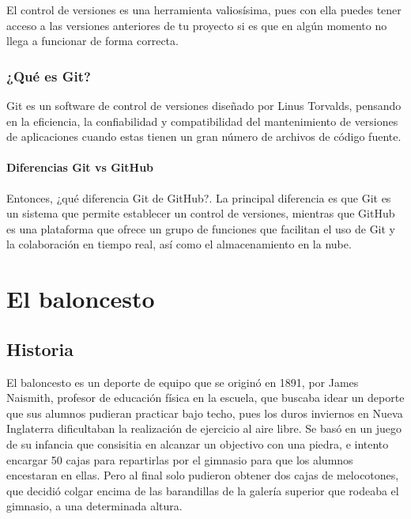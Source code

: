 \documentclass[
]{article}
\begin{document}
El control de versiones es una herramienta valiosísima, pues con ella
puedes tener acceso a las versiones anteriores de tu proyecto si es que
en algún momento no llega a funcionar de forma correcta.

\hypertarget{quuxe9-es-git}{%
\subsubsection{¿Qué es Git?}\label{quuxe9-es-git}}

Git es un software de control de versiones diseñado por Linus Torvalds,
pensando en la eficiencia, la confiabilidad y compatibilidad del
mantenimiento de versiones de aplicaciones cuando estas tienen un gran
número de archivos de código fuente.

\hypertarget{diferencias-git-vs-github}{%
\paragraph{Diferencias Git vs GitHub}\label{diferencias-git-vs-github}}

Entonces, ¿qué diferencia Git de GitHub?. La principal diferencia es que
Git es un sistema que permite establecer un control de versiones,
mientras que GitHub es una plataforma que ofrece un grupo de funciones
que facilitan el uso de Git y la colaboración en tiempo real, así como
el almacenamiento en la nube.

\hypertarget{el-baloncesto}{%
\section{El baloncesto}\label{el-baloncesto}}

\hypertarget{historia}{%
\subsection{Historia}\label{historia}}

El baloncesto es un deporte de equipo que se originó en 1891, por James
Naismith, profesor de educación física en la escuela, que buscaba idear
un deporte que sus alumnos pudieran practicar bajo techo, pues los duros
inviernos en Nueva Inglaterra dificultaban la realización de ejercicio
al aire libre. Se basó en un juego de su infancia que consisitia en
alcanzar un objectivo con una piedra, e intento encargar 50 cajas para
repartirlas por el gimnasio para que los alumnos encestaran en ellas.
Pero al final solo pudieron obtener dos cajas de melocotones, que
decidió colgar encima de las barandillas de la galería superior que
rodeaba el gimnasio, a una determinada altura.
\end{document}
